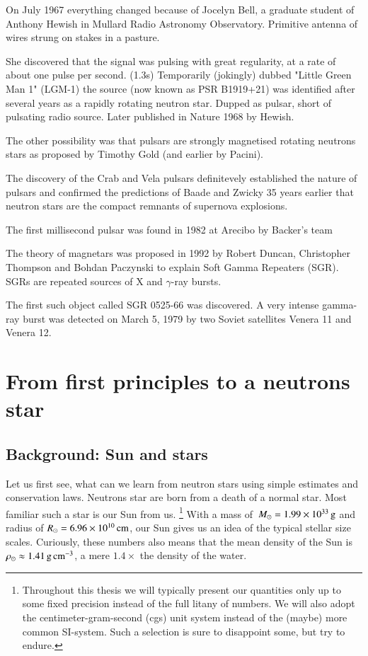 On July 1967 everything changed because of Jocelyn Bell, a graduate student of Anthony Hewish in Mullard Radio Astronomy Observatory.
Primitive antenna of wires strung on stakes in a pasture.

She discovered that the signal was pulsing with great regularity, at a rate of about one pulse per second. (1.3s)
Temporarily (jokingly) dubbed "Little Green Man 1" (LGM-1) the source (now known as PSR B1919+21) was identified after several years as a rapidly rotating neutron star.
Dupped as pulsar, short of pulsating radio source.
Later published in Nature 1968 by Hewish. \cite{Hewish68}


The other possibility was that pulsars are strongly magnetised rotating neutrons stars as proposed by Timothy Gold (and earlier by Pacini).
\cite{Gold68}

The discovery of the Crab and Vela pulsars definitevely established the nature of pulsars and confirmed the predictions of Baade and Zwicky 35 years earlier that neutron stars are the compact remnants of supernova explosions.


The first millisecond pulsar was found in 1982 at Arecibo by Backer’s team

The theory of magnetars was proposed in 1992 by Robert Duncan, Christopher Thompson and Bohdan Paczynski to explain Soft Gamma Repeaters (SGR). SGRs are repeated sources of X and $\gamma$-ray bursts. \cite{DT92}

The first such object called SGR 0525-66 was discovered.
A very intense gamma-ray burst was detected on March 5, 1979 by two Soviet satellites Venera 11 and Venera 12.\cite{MGI79}



\section{From first principles to a neutrons star}

\subsection{Background: Sun and stars}
Let us first see, what can we learn from neutron stars using simple estimates and conservation laws.
Neutrons star are born from a death of a normal star.%
Most familiar such a star is our Sun  \cm from us.%
\footnote{Throughout this thesis we will typically present our quantities only up to some fixed precision instead of the full litany of numbers.
We will also adopt the centimeter-gram-second (cgs) unit system instead of the (maybe) more common SI-system. 
Such a selection is sure to disappoint some, but try to endure.
}
With a mass of $\, M_{\odot} = 1.99 \times 10^{33} \, \mathrm{g}$ and radius of $R_{\odot} = 6.96 \times 10^{10} \, \mathrm{cm}$, our Sun gives us an idea of the typical stellar size scales.
Curiously, these numbers also means that the mean density of the Sun is $\rho_{\odot} \approx 1.41 \, \mathrm{g}\,\mathrm{cm}^{-3} $, a mere $1.4\times$ the density of the water.


